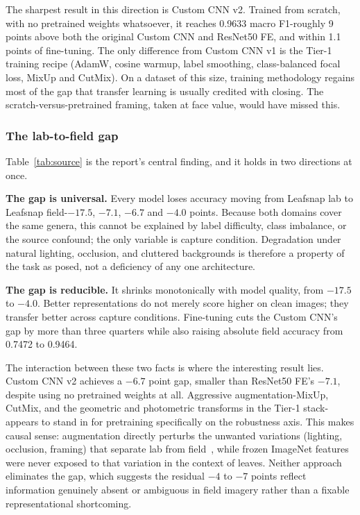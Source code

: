 \documentclass[12pt,a4paper]{article}
\begin{document}
The sharpest result in this direction is Custom CNN v2. Trained from scratch, with no pretrained weights whatsoever, it reaches 0.9633 macro F1-roughly 9 points above both the original Custom CNN and ResNet50 FE, and within 1.1 points of fine-tuning. The only difference from Custom CNN v1 is the Tier-1 training recipe (AdamW, cosine warmup, label smoothing, class-balanced focal loss, MixUp and CutMix). On a dataset of this size, training methodology regains most of the gap that transfer learning is usually credited with closing. The scratch-versus-pretrained framing, taken at face value, would have missed this.

\subsubsection{The lab-to-field gap}
Table~\ref{tab:source} is the report's central finding, and it holds in two directions at once.

\textbf{The gap is universal.} Every model loses accuracy moving from Leafsnap lab to Leafsnap field-$-17.5$, $-7.1$, $-6.7$ and $-4.0$ points. Because both domains cover the same genera, this cannot be explained by label difficulty, class imbalance, or the source confound; the only variable is capture condition. Degradation under natural lighting, occlusion, and cluttered backgrounds is therefore a property of the task as posed, not a deficiency of any one architecture.

\textbf{The gap is reducible.} It shrinks monotonically with model quality, from $-17.5$ to $-4.0$. Better representations do not merely score higher on clean images; they transfer better across capture conditions. Fine-tuning cuts the Custom CNN's gap by more than three quarters while also raising absolute field accuracy from 0.7472 to 0.9464.

The interaction between these two facts is where the interesting result lies. Custom CNN v2 achieves a $-6.7$ point gap, smaller than ResNet50 FE's $-7.1$, despite using no pretrained weights at all. Aggressive augmentation-MixUp, CutMix, and the geometric and photometric transforms in the Tier-1 stack-appears to stand in for pretraining specifically on the robustness axis. This makes causal sense: augmentation directly perturbs the unwanted variations (lighting, occlusion, framing) that separate lab from field~\cite{hendrycks2020}, while frozen ImageNet features were never exposed to that variation in the context of leaves. Neither approach eliminates the gap, which suggests the residual $-4$ to $-7$ points reflect information genuinely absent or ambiguous in field imagery rather than a fixable representational shortcoming.
\end{document}
